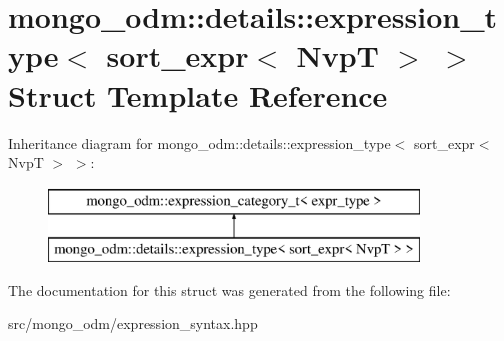 \hypertarget{structmongo__odm_1_1details_1_1expression__type_3_01sort__expr_3_01NvpT_01_4_01_4}{}\section{mongo\+\_\+odm\+:\+:details\+:\+:expression\+\_\+type$<$ sort\+\_\+expr$<$ NvpT $>$ $>$ Struct Template Reference}
\label{structmongo__odm_1_1details_1_1expression__type_3_01sort__expr_3_01NvpT_01_4_01_4}
Inheritance diagram for mongo\+\_\+odm\+:\+:details\+:\+:expression\+\_\+type$<$ sort\+\_\+expr$<$ NvpT $>$ $>$\+:\begin{figure}[H]
\begin{center}
\leavevmode
\includegraphics[height=2.000000cm]{structmongo__odm_1_1details_1_1expression__type_3_01sort__expr_3_01NvpT_01_4_01_4}
\end{center}
\end{figure}


The documentation for this struct was generated from the following file\+:\begin{DoxyCompactItemize}
\item 
src/mongo\+\_\+odm/expression\+\_\+syntax.\+hpp\end{DoxyCompactItemize}

